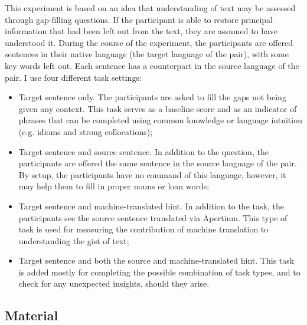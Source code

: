 \documentclass[11pt]{article}
\begin{document}
This experiment is based on an idea that understanding of text may be assessed through
gap-filling questions. If the participant is able to restore principal information that had
been left out from the text, they are assumed to have understood it.
During the course of the experiment, the participants are offered sentences in their native
language (the target language of the pair), with some key words left out. Each sentence
has a counterpart in the source language of the pair. I use four different task settings:
\begin{itemize}
\item  Target sentence only. The participants are asked to fill the gaps not being given
any context. This task serves as a baseline score and as an indicator of phrases
that can be completed using common knowledge or language intuition (e.g.
idioms and strong collocations);
\item  Target sentence and source sentence. In addition to the question, the participants
are offered the same sentence in the source language of the pair. By setup, the
participants have no command of this language, however, it may help them to fill
in proper nouns or loan words;
\item  Target sentence and machine-translated hint. In addition to the task, the
participants see the source sentence translated via Apertium. This type of task is
used for measuring the contribution of machine translation to understanding the
gist of text;
\item  Target sentence and both the source and machine-translated hint. This task is
added mostly for completing the possible combination of task types, and to check
for any unexpected insights, should they arise.
\end{itemize}

\subsection{Material}
\end{document}
